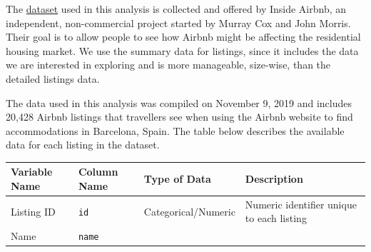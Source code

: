 \documentclass[]{article}
\begin{document}
The \href{http://insideairbnb.com/get-the-data.html}{dataset} used in
this analysis is collected and offered by Inside Airbnb, an independent,
non-commercial project started by Murray Cox and John Morris. Their goal
is to allow people to see how Airbnb might be affecting the residential
housing market. We use the summary data for listings, since it includes
the data we are interested in exploring and is more manageable,
size-wise, than the detailed listings data.

The data used in this analysis was compiled on November 9, 2019 and
includes 20,428 Airbnb listings that travellers see when using the
Airbnb website to find accommodations in Barcelona, Spain. The table
below describes the available data for each listing in the dataset.

\begin{longtable}[]{@{}llll@{}}
\toprule
\begin{minipage}[b]{0.22\columnwidth}\raggedright
Variable Name\strut
\end{minipage} & \begin{minipage}[b]{0.22\columnwidth}\raggedright
Column Name\strut
\end{minipage} & \begin{minipage}[b]{0.22\columnwidth}\raggedright
Type of Data\strut
\end{minipage} & \begin{minipage}[b]{0.22\columnwidth}\raggedright
Description\strut
\end{minipage}\tabularnewline
\midrule
\endhead
\begin{minipage}[t]{0.22\columnwidth}\raggedright
Listing ID\strut
\end{minipage} & \begin{minipage}[t]{0.22\columnwidth}\raggedright
\texttt{id}\strut
\end{minipage} & \begin{minipage}[t]{0.22\columnwidth}\raggedright
Categorical/Numeric\strut
\end{minipage} & \begin{minipage}[t]{0.22\columnwidth}\raggedright
Numeric identifier unique to each listing\strut
\end{minipage}\tabularnewline
\begin{minipage}[t]{0.22\columnwidth}\raggedright
Name\strut
\end{minipage} & \begin{minipage}[t]{0.22\columnwidth}\raggedright
\texttt{name}\strut
\end{minipage} & \begin{minipage}[t]{0.22\columnwidth}\raggedright

\end{minipage}
\end{longtable}
\end{document}
